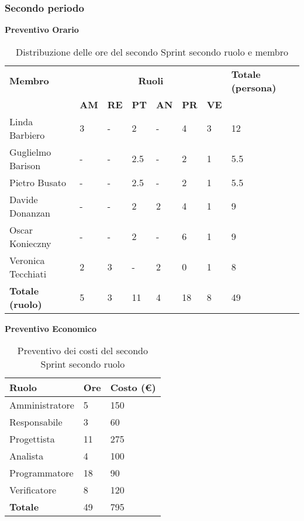 \subsubsection{Secondo periodo}
\textbf{Preventivo Orario}
\begin{table}[ht!]
	\centering
	\begin{tabular}{p{4cm} p{1cm} p{1cm} p{1cm} p{1cm} p{1cm} p{1cm} p{3cm}}
        \toprule
        \textbf{Membro} & \multicolumn{6}{c}{\textbf{Ruoli}} & \textbf{Totale (persona)}\\
		& \textbf{AM} & \textbf{RE} & \textbf{PT} & \textbf{AN} & \textbf{PR} & \textbf{VE}\\
		\midrule
        Linda Barbiero          & 3     & -     & 2     & -     & 4     & 3     & 12 \\
        Guglielmo Barison       & -     & -     & 2.5     & -     & 2   & 1     & 5.5\\
        Pietro Busato           & -     & -     & 2.5     & -     & 2   & 1     & 5.5 \\
        Davide Donanzan         & -     & -     & 2     & 2     & 4     & 1   & 9 \\
        Oscar Konieczny         & -     & -     & 2     & -     & 6     & 1     & 9 \\
        Veronica Tecchiati      & 2     & 3     & -     & 2     & 0     & 1     & 8 \\
        \bottomrule
        \textbf{Totale (ruolo)} & 5     & 3     & 11     & 4   & 18     & 8   & 49 \\
	\end{tabular}
	\caption{Distribuzione delle ore del secondo Sprint secondo ruolo e membro}
	\label{table:Distribuzione delle ore del secondo Sprint secondo ruolo e membro}
\end{table}

\textbf{Preventivo Economico}
\begin{table}[ht!]
	\centering
	\begin{tabular}{p{4cm} p{1cm} p{2cm}}
        \toprule
        \textbf{Ruolo} & \textbf{Ore} & \textbf{Costo (€)} \\
        \midrule
        Amministratore & 5 & 150 \\
        Responsabile & 3 & 60 \\
        Progettista & 11 & 275 \\
        Analista & 4 & 100 \\
        Programmatore & 18 & 90 \\
        Verificatore & 8 & 120 \\
        \bottomrule
        \textbf{Totale} & 49 & 795
    \end{tabular}
    \caption{Preventivo dei costi del secondo Sprint secondo ruolo}
	\label{table:Preventivo dei costi del secondo Sprint secondo ruolo}
\end{table}

